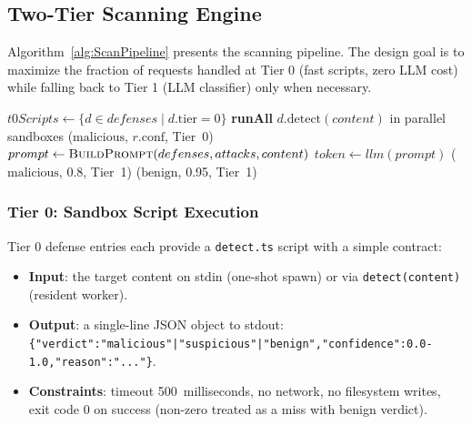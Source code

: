 \subsection{Two-Tier Scanning Engine}
\label{sec:Scanning}

Algorithm~\ref{alg:ScanPipeline} presents the scanning pipeline. The design goal is to maximize the fraction of requests handled at Tier 0 (fast scripts, zero LLM cost) while falling back to Tier 1 (LLM classifier) only when necessary.

\begin{algorithm}[t]
\caption{Two-Tier Scanning Pipeline}
\label{alg:ScanPipeline}
\begin{algorithmic}[1]
  \State $t0Scripts \gets \{d \in defenses \mid d.\text{tier}=0\}$
  \State \textbf{runAll} $d.\text{detect}(content)$ in parallel sandboxes
      \State \Return ($\text{malicious}$, $r.\text{conf}$, Tier~0)
    \EndIf
  \EndFor
  \State $prompt \gets \textsc{BuildPrompt}(defenses, attacks, content)$
  \State $token \gets llm(prompt)$ \quad{}
    \State \Return ($\text{malicious}$, 0.8, Tier~1)
  \Else
    \State \Return ($\text{benign}$, 0.95, Tier~1)
  \EndIf
\EndFunction
\end{algorithmic}
\end{algorithm}

\subsubsection{Tier 0: Sandbox Script Execution}

Tier 0 defense entries each provide a \texttt{detect.ts} script with a simple contract:
\begin{itemize}[nosep]
  \item \textbf{Input}: the target content on stdin (one-shot spawn) or via \texttt{detect(content)} (resident worker).
  \item \textbf{Output}: a single-line JSON object to stdout: \texttt{\{"verdict":"malicious"|"suspicious"|"benign","confidence":0.0-1.0,"reason":"..."\}}.
  \item \textbf{Constraints}: timeout 500~milliseconds, no network, no filesystem writes, exit code 0 on success (non-zero treated as a miss with benign verdict).
\end{itemize}


